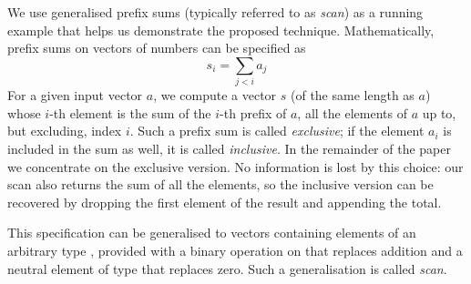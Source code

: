 \begin{code}[hide]
\\
%
\\[\AgdaEmptyExtraSkip]%
\>[0]\AgdaSpace{}%
\AgdaSpace{}%
\AgdaSpace{}%
\AgdaSpace{}%
\AgdaSymbol{(}\AgdaSymbol{)}\<%
\\
\>[0]\AgdaSpace{}%
\AgdaSpace{}%
\<%
\\
\>[0]\AgdaSpace{}%
\<%
\\
%
\\[\AgdaEmptyExtraSkip]%
\>[0]\AgdaSpace{}%
\AgdaSpace{}%
\<%
\\
%
\\[\AgdaEmptyExtraSkip]%
\>[0]\AgdaSpace{}%
\AgdaSpace{}%
\AgdaSymbol{=}\AgdaSpace{}%
\<%
\\
%
\\[\AgdaEmptyExtraSkip]%
\>[0]\AgdaSpace{}%
\<%
\\
\>[0][@{}l@{\AgdaIndent{0}}]%
\>[2]\AgdaSpace{}%
\AgdaSpace{}%
\AgdaSymbol{:}\AgdaSpace{}%
\<%
\\
%
\>[2]\AgdaSpace{}%
\AgdaSpace{}%
\AgdaSpace{}%
\AgdaSymbol{:}\AgdaSpace{}%
\<%
\end{code}
We use generalised prefix sums (typically referred to as \emph{scan}) as a
running example that helps us demonstrate the proposed technique.
Mathematically, prefix sums on vectors of numbers can be specified as  
\[
        s_i = \sum\limits_{j<i}a_j
\]
For a given input vector $a$, we compute a vector $s$ (of the same length as
$a$) whose $i$-th element is the sum of the $i$-th prefix of $a$, \ie{} all the
elements of $a$ up to, but excluding, index $i$.  Such a prefix sum is called
\emph{exclusive}; if the element $a_i$ is included in the sum as well, it is
called \emph{inclusive}.  In the remainder of the paper we concentrate on the
exclusive version.  No information is lost by this choice: our scan also
returns the sum of all the elements, so the inclusive version can be recovered
by dropping the first element of the result and appending the total.

This specification can be generalised to vectors containing elements of an
arbitrary type , provided with a binary operation on  that replaces
addition and a neutral element of type  that replaces zero. Such a
generalisation is called \emph{scan}.

